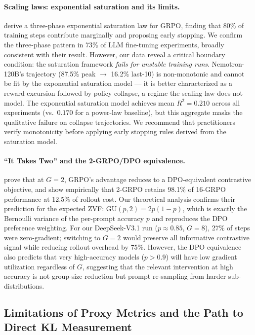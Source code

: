 \documentclass{article}
\begin{document}
\paragraph{Scaling laws: exponential saturation and its limits.}
\citet{nimmaturi2025predictive} derive a three-phase exponential saturation
law for GRPO, finding that 80\% of training steps contribute marginally and
proposing early stopping.
We confirm the three-phase pattern in 73\% of LLM fine-tuning experiments,
broadly consistent with their result.
However, our data reveal a critical boundary condition: the saturation
framework \emph{fails for unstable training runs}.
Nemotron-120B's trajectory (87.5\% peak $\to$ 16.2\% last-10) is
non-monotonic and cannot be fit by the exponential saturation model ---
it is better characterized as a reward excursion followed by policy
collapse, a regime the scaling law does not model.
The exponential saturation model achieves mean $R^{2} = 0.210$ across all
experiments (vs.\ $0.170$ for a power-law baseline), but this aggregate
masks the qualitative failure on collapse trajectories.
We recommend that practitioners verify monotonicity before applying early
stopping rules derived from the saturation model.

\paragraph{``It Takes Two'' and the 2-GRPO/DPO equivalence.}
\citet{wu2025grpodpo} prove that at $G = 2$, GRPO's advantage reduces to a
DPO-equivalent contrastive objective, and show empirically that 2-GRPO retains
98.1\% of 16-GRPO performance at 12.5\% of rollout cost.
Our theoretical analysis confirms their prediction for the expected ZVF:
$\mathrm{GU}(p, 2) = 2p(1-p)$, which is exactly the Bernoulli variance of
the per-prompt accuracy $p$ and reproduces the DPO preference weighting.
For our DeepSeek-V3.1 run ($p \approx 0.85$, $G = 8$), 27\% of steps were
zero-gradient; switching to $G = 2$ would preserve all informative contrastive
signal while reducing rollout overhead by 75\%.
However, the DPO equivalence also predicts that very high-accuracy models
($p > 0.9$) will have low gradient utilization regardless of $G$, suggesting
that the relevant intervention at high accuracy is not group-size reduction
but prompt re-sampling from harder sub-distributions.

\subsection{Limitations of Proxy Metrics and the Path to Direct KL Measurement}
\label{sec:discuss_kl}
\end{document}
